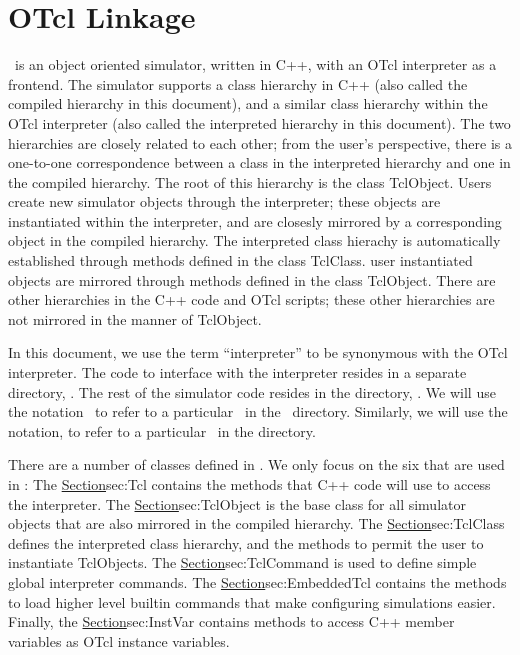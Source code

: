 \chapter{OTcl Linkage}
\label{chap:otcl:intro}

\ns\ is an object oriented simulator,
written in C++, with an OTcl interpreter as a frontend.
The simulator supports a class hierarchy in C++
(also called the compiled hierarchy in this document),
and a similar class hierarchy within the OTcl interpreter
(also called the interpreted hierarchy in this document).
The two hierarchies are closely related to each other;
from the user's perspective,
there is a one-to-one correspondence
between a class in the interpreted hierarchy
and one in the compiled hierarchy.
The root of this hierarchy is the class TclObject.
Users create new simulator objects through the interpreter;
these objects are instantiated within the interpreter, 
and are closesly mirrored by a corresponding object
in the compiled hierarchy.
The interpreted class hierachy is automatically established through
methods defined in the class TclClass.
user instantiated objects are mirrored through methods
defined in the class TclObject.
There are other hierarchies in the C++ code and OTcl scripts;
these other hierarchies are not mirrored in the manner of TclObject.

In this document,
we use the term ``interpreter''
to be synonymous with the OTcl interpreter.
The code to interface with the interpreter resides
in a separate directory, .
The rest of the simulator code resides in the directory, .
We will use the notation \
to refer to a particular \ in the
\ directory.
Similarly, we will use the notation, 
to refer to a particular \tup{file}\ in the  directory.

There are a number of classes defined in \Tclf{}.
We only focus on the six that are used in \ns:
The \href{Class Tcl}{Section}{sec:Tcl} contains the methods that
C++ code will use to access the interpreter.
The \href{class TclObject}{Section}{sec:TclObject}
is the base class for all simulator objects that are also mirrored 
in the compiled hierarchy.
The \href{class TclClass}{Section}{sec:TclClass} defines
the interpreted class hierarchy, and 
the methods to permit the user to instantiate TclObjects.
The \href{class TclCommand}{Section}{sec:TclCommand}
is used to define simple global interpreter commands.
The \href{class EmbeddedTcl}{Section}{sec:EmbeddedTcl}
contains the methods to load higher level builtin commands
that make configuring simulations easier.
Finally, the \href{class InstVar}{Section}{sec:InstVar}
contains methods to access C++ member variables
as OTcl instance variables.

